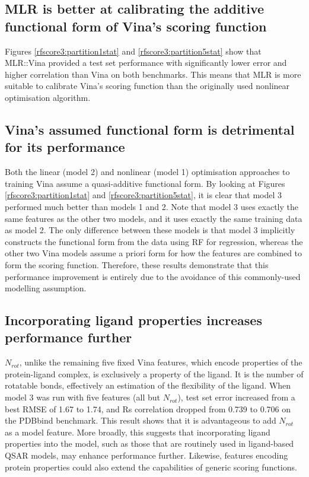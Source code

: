 \subsection{MLR is better at calibrating the additive functional form of Vina's scoring function}

Figures \ref{rfscore3:partition1stat} and \ref{rfscore3:partition5stat} show that MLR::Vina provided a test set performance with significantly lower error and higher correlation than Vina on both benchmarks. This means that MLR is more suitable to calibrate Vina's scoring function than the originally used nonlinear optimisation algorithm.

\subsection{Vina's assumed functional form is detrimental for its performance}

Both the linear (model 2) and nonlinear (model 1) optimisation approaches to training Vina assume a quasi-additive functional form. By looking at Figures \ref{rfscore3:partition1stat} and \ref{rfscore3:partition5stat}, it is clear that model 3 performed much better than models 1 and 2. Note that model 3 uses exactly the same features as the other two models, and it uses exactly the same training data as model 2. The only difference between these models is that model 3 implicitly constructs the functional form from the data using RF for regression, whereas the other two Vina models assume a priori form for how the features are combined to form the scoring function. Therefore, these results demonstrate that this performance improvement is entirely due to the avoidance of this commonly-used modelling assumption.

\subsection{Incorporating ligand properties increases performance further}

$N_{rot}$, unlike the remaining five fixed Vina features, which encode properties of the protein-ligand complex, is exclusively a property of the ligand. It is the number of rotatable bonds, effectively an estimation of the flexibility of the ligand. When model 3 was run with five features (all but $N_{rot}$), test set error increased from a best RMSE of 1.67 to 1.74, and Rs correlation dropped from 0.739 to 0.706 on the PDBbind benchmark. This result shows that it is advantageous to add $N_{rot}$ as a model feature. More broadly, this suggests that incorporating ligand properties into the model, such as those that are routinely used in ligand-based QSAR models, may enhance performance further. Likewise, features encoding protein properties could also extend the capabilities of generic scoring functions.

